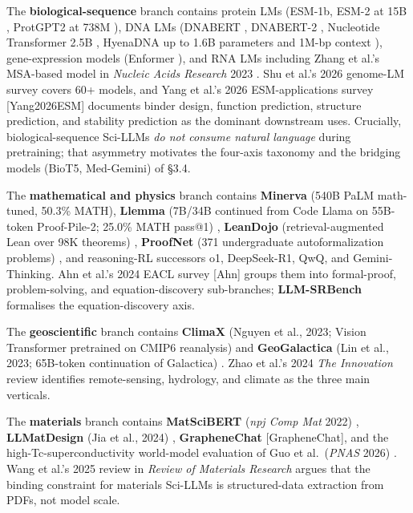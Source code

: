 \documentclass{article}
\begin{document}
The \textbf{biological-sequence} branch contains protein LMs (ESM-1b, ESM-2 at 15B \cite{lin2022evolutionaryscalep}, ProtGPT2 at 738M \cite{ferruz2022naturecommunicatio}), DNA LMs (DNABERT \cite{ji2020biorxiv2020}, DNABERT-2 \cite{zhou2023arxiv2306150062023}, Nucleotide Transformer 2.5B \cite{dallatorre2024nucleotidetransfor}, HyenaDNA up to 1.6B parameters and 1M-bp context \cite{nguyen2023hyenadnalongrangeg}), gene-expression models (Enformer \cite{avsec2021effectivegeneexpre}), and RNA LMs including Zhang et al.'s MSA-based model in \emph{Nucleic Acids Research} 2023 \cite{zhang2023multiplesequenceal}. Shu et al.'s 2026 genome-LM survey \cite{shu2026acomprehensivesurv} covers 60+ models, and Yang et al.'s 2026 ESM-applications survey {[}Yang2026ESM{]} documents binder design, function prediction, structure prediction, and stability prediction as the dominant downstream uses. Crucially, biological-sequence Sci-LLMs \emph{do not consume natural language} during pretraining; that asymmetry motivates the four-axis taxonomy and the bridging models (BioT5, Med-Gemini) of §3.4.

The \textbf{mathematical and physics} branch contains \textbf{Minerva} (540B PaLM math-tuned, 50.3\% MATH), \textbf{Llemma} (7B/34B continued from Code Llama on 55B-token Proof-Pile-2; 25.0\% MATH pass@1) \cite{azerbayev2023llemmaanopenlangua}, \textbf{LeanDojo} (retrieval-augmented Lean over 98K theorems) \cite{yang2023leandojotheorempro}, \textbf{ProofNet} (371 undergraduate autoformalization problems) \cite{azerbayev2023arxiv2302124332023}, and reasoning-RL successors o1, DeepSeek-R1, QwQ, and Gemini-Thinking. Ahn et al.'s 2024 EACL survey {[}Ahn{]} groups them into formal-proof, problem-solving, and equation-discovery sub-branches; \textbf{LLM-SRBench} \cite{shojaee2025llmsrbenchanewbenc} formalises the equation-discovery axis.

The \textbf{geoscientific} branch contains \textbf{ClimaX} (Nguyen et al., 2023; Vision Transformer pretrained on CMIP6 reanalysis) \cite{nguyen2023arxiv2301103432023} and \textbf{GeoGalactica} (Lin et al., 2023; 65B-token continuation of Galactica) \cite{lin2023geogalacticaascien}. Zhao et al.'s 2024 \emph{The Innovation} review \cite{zhao2024artificialintellig} identifies remote-sensing, hydrology, and climate as the three main verticals.

The \textbf{materials} branch contains \textbf{MatSciBERT} (\emph{npj Comp Mat} 2022) \cite{gupta2022matscibertamateria}, \textbf{LLMatDesign} (Jia et al., 2024) \cite{jia2024arxiv2406131632024}, \textbf{GrapheneChat} {[}GrapheneChat{]}, and the high-Tc-superconductivity world-model evaluation of Guo et al.~(\emph{PNAS} 2026) \cite{guo2026expertevaluationof}. Wang et al.'s 2025 review in \emph{Review of Materials Research} \cite{wang2025knowledgeguidedlar} argues that the binding constraint for materials Sci-LLMs is structured-data extraction from PDFs, not model scale.
\end{document}
